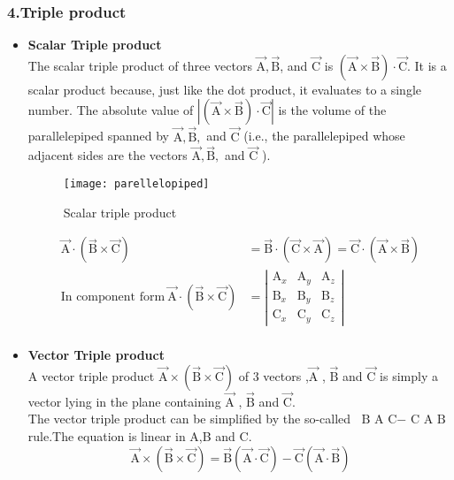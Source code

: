 \subsubsection{4.Triple product}
\begin{itemize}
	\item \textbf{Scalar Triple product}
	\\The scalar triple product of three vectors $\vec{\mathrm{A}}, \vec{\mathrm{B}}$, and $\vec{\mathrm{C}}$ is $(\vec{\mathrm{A}} \times\vec{\mathrm{B}}) \cdot \vec{\mathrm{C}} .$ It is a scalar product because, just like the dot product, it evaluates to a single number.  The absolute value of $|(\vec{\mathrm{A}} \times \vec{\mathrm{B}}) \cdot \vec{\mathrm{C}}|$ is the volume of the parallelepiped spanned by $\vec{\mathrm{A}}, \vec{\mathrm{B}},$ and $\vec{\mathrm{C}}$ (i.e., the parallelepiped whose adjacent sides are the vectors $\vec{\mathrm{A}}, \vec{\mathrm{B}},$ and $\vec{\mathrm{C}}$ ).\begin{figure}[H]
		\begin{center}
			\texttt{[image: parellelopiped]}
		\end{center}
	\caption{Scalar triple product}
	\end{figure}
\begin{align*}
	\vec{\mathrm A} \cdot(\vec{\mathrm B} \times \vec{\mathrm C})&=\vec{\mathrm B} \cdot(\vec{\mathrm C} \times \vec{\mathrm A})=\vec{\mathrm C} \cdot(\vec{\mathrm A} \times \vec{\mathrm B})\\
	\text{In component form}\ \vec{\mathrm A} \cdot(\vec{\mathrm B} \times \vec{\mathrm C})&=\left|\begin{array}{lll}\mathrm A_{x} & \mathrm A_{y} & \mathrm A_{z} \\ \mathrm B_{x} & \mathrm B_{y} & \mathrm B_{z} \\ \mathrm C_{x} & \mathrm C_{y} & \mathrm C_{z}\end{array}\right|\\
\end{align*}

	\item \textbf{Vector Triple product}
	\\A vector triple product $\vec{\mathrm A} \times(\vec{\mathrm B} \times \vec{\mathrm C})$ of 3 vectors ,$\vec{\mathrm A}$ , $\vec{\mathrm B}$ and $\vec{\mathrm C}$ is simply a vector lying in the plane containing $\vec{\mathrm A}$ , $\vec{\mathrm B}$ and $\vec{\mathrm C}$.\\

	The vector triple product can be simplified by the so-called $\text{ B A C}-\text{ C A B}$ rule.The equation is linear in  A,B and C.
	$$
	\vec{\mathrm A} \times(\vec{\mathrm B} \times \vec{\mathrm C})=\vec{\mathrm B}(\vec{\mathrm A} \cdot \vec{\mathrm C})-\vec{\mathrm C}(\vec{\mathrm A} \cdot \vec{\mathrm B})
	$$
\end{itemize}
